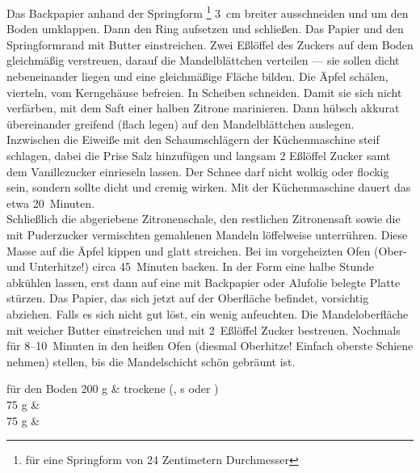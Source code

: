       \begin{zubereitung}
        Das Backpapier anhand der Springform%
	\footnote{für eine Springform von 24 Zentimetern Durchmesser}
	3~cm breiter ausschneiden und um den Boden umklappen. Dann den Ring
	aufsetzen und schließen. Das Papier und den Springformrand mit Butter
	einstreichen. Zwei Eßlöffel des Zuckers auf dem Boden gleichmäßig
	verstreuen, darauf die Mandelblättchen verteilen --- sie sollen dicht
	nebeneinander liegen und eine gleichmäßige Fläche bilden. Die Äpfel
	schälen, vierteln, vom Kerngehäuse befreien. In Scheiben schneiden.
	Damit sie sich nicht verfärben, mit dem Saft einer halben Zitrone
	marinieren. Dann hübsch akkurat übereinander greifend (flach legen) auf
	den Mandelblättchen auslegen. \\
	Inzwischen die Eiweiße mit den Schaumschlägern der Küchenmaschine steif
	schlagen, dabei die Prise Salz hinzufügen und langsam 2 Eßlöffel Zucker
	samt dem Vanillezucker einrieseln lassen. Der Schnee darf nicht wolkig
	oder flockig sein, sondern sollte dicht und cremig wirken.
	Mit der Küchenmaschine dauert das etwa 20~Minuten. \\
	Schließlich die abgeriebene Zitronenschale, den restlichen Zitronensaft
	sowie die mit Puderzucker vermischten gemahlenen Mandeln löffelweise
	unterrühren. Diese Masse auf die Äpfel kippen und glatt streichen. Bei
	 im vorgeheizten Ofen (Ober- und Unterhitze!) circa
	45~Minuten backen. In der Form eine halbe Stunde abkühlen lassen, erst
	dann auf eine mit Backpapier oder Alufolie belegte Platte stürzen. Das
	Papier, das sich jetzt auf der Oberfläche befindet, vorsichtig
	abziehen. Falls es sich nicht gut löst, ein wenig anfeuchten. Die
	Mandeloberfläche mit weicher Butter einstreichen und mit 2~Eßlöffel
	Zucker bestreuen. Nochmals für 8--10~Minuten in den  heißen
	Ofen (diesmal Oberhitze! Einfach oberste Schiene nehmen) stellen, bis
	die Mandelschicht schön gebräunt ist. \\
      \end{zubereitung}



      \begin{zutaten}
      \end{zutaten}

      \begin{zutat}{für den Boden}
        200 g & trockene 
	        (,
		 s oder
		 ) \\
        75 g &  \\
	75 g &  \\
      \end{zutat}

